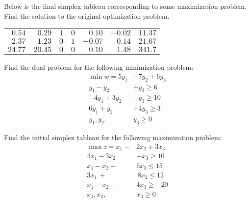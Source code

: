 \documentclass[12pt,letterpaper]{exam}
\begin{document}
\begin{questions}
\newpage
\question[10] Below is the final simplex tableau corresponding to some maximization problem. Find the solution to the original optimization problem. \par
	\begin{table}[!ht]
	\centering
	\begin{tabular}{rrrrrrr}
	$0.54$ & $0.29$ & $1$ & $0$ & $0.10$ & $-0.02$ & $11.37$ \\
	$2.37$ & $1.23$ & $0$ & $1$ & $-0.07$ & $0.14$ & $21.67$ \\
	$24.77$ & $20.45$ & $0$ & $0$& $0.10$ & $1.48$ & $341.7$
	\end{tabular}
	\end{table}



\newpage
\question[10] Find the dual problem for the following minimization problem:
	\[
	\begin{aligned}
	\min w= 5y_1 &- 7y_2 + 6y_3 \\
	y_1 - y_2 &+ y_3 \geq 6 \\
	-4y_1 + 3y_2 &- y_3 \geq 10 \\
	6y_1 + y_2 &+ 4y_3 \geq 3 \\
	y_1, y_2, \,&y_3 \geq 0
	\end{aligned}
	\]



\newpage
\question[10] Find the initial simplex tableau for the following maximization problem:
	\[
	\begin{aligned}
	\max z= x_1 - &2x_2 + 3x_3 \\
	4x_1 - 3x_2 &+ x_3 \geq 10 \\
	x_1 - x_2 + &6x_3 \leq 15 \\
	3x_1 \,+ &\,8x_2 \leq 12 \\
	x_1 - x_2 \,-\, &4x_3 \geq -20 \\
	x_1, x_2, \,&x_3 \geq 0 
	\end{aligned}
	\]


\end{questions}
\end{document}
